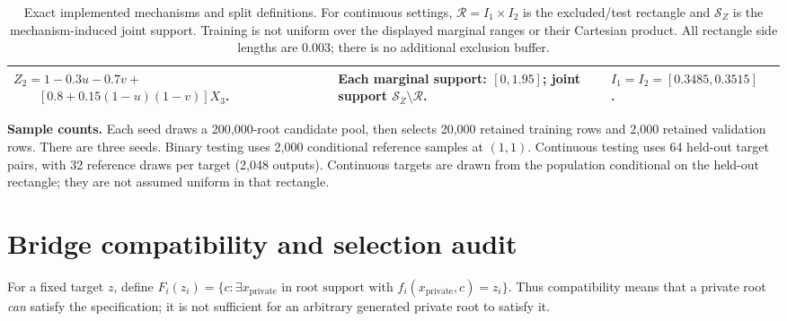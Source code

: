 \documentclass[11pt]{article}
\newcommand{\R}{\mathcal{R}}
\begin{document}
\begin{table}[h!]
\begin{tabular}{p{24mm}p{90mm}p{41mm}p{77mm}}
$Z_2=1-0.3u-0.7v+$\newline
$\qquad[0.8+0.15(1-u)(1-v)]X_3$. & Each marginal support: $[0,1.95]$; joint support $\mathcal S_Z\setminus\R$. & $I_1=I_2=[0.3485,0.3515]$. \\
\bottomrule
\end{tabular}
\caption{Exact implemented mechanisms and split definitions. For continuous settings, $\R=I_1\times I_2$ is the excluded/test rectangle and $\mathcal S_Z$ is the mechanism-induced joint support. Training is not uniform over the displayed marginal ranges or their Cartesian product. All rectangle side lengths are $0.003$; there is no additional exclusion buffer.}
\end{table}

\textbf{Sample counts.} Each seed draws a 200,000-root candidate pool, then selects 20,000 retained training rows and 2,000 retained validation rows. There are three seeds. Binary testing uses 2,000 conditional reference samples at $(1,1)$. Continuous testing uses 64 held-out target pairs, with 32 reference draws per target (2,048 outputs). Continuous targets are drawn from the population conditional on the held-out rectangle; they are not assumed uniform in that rectangle.

\clearpage
\section*{Bridge compatibility and selection audit}
For a fixed target $z$, define $F_i(z_i)=\{c:\exists x_{\mathrm{private}}\text{ in root support with }f_i(x_{\mathrm{private}},c)=z_i\}$. Thus compatibility means that a private root \emph{can} satisfy the specification; it is not sufficient for an arbitrary generated private root to satisfy it.
\end{document}
